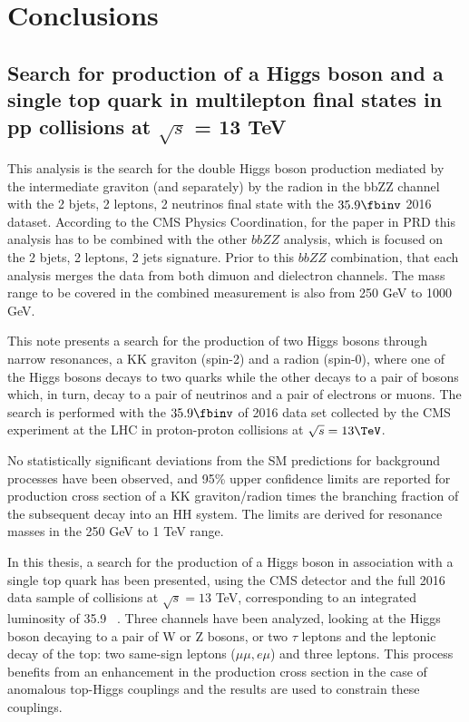 \chapter{Conclusions}
\label{ch:Conclusions}


\section[Search for production of a Higgs boson and a single top quark]{Search for production of a Higgs boson and a single top quark in multilepton final states in pp collisions at $\sqrt{s}$ = 13 TeV}



This analysis is the search for the double Higgs boson production mediated by the intermediate graviton (and separately) by the radion in the bbZZ channel with the 2 bjets, 2 leptons, 2 neutrinos final state with the $35.9\fbinv$ 2016 dataset. According to the CMS Physics Coordination, for the paper in PRD this analysis has to be combined with the other $bbZZ$ analysis, which is focused on the 2 bjets, 2 leptons, 2 jets signature. Prior to this $bbZZ$ combination, that each analysis merges the data from both dimuon and dielectron channels. The mass range to be covered in the combined measurement is also from 250 GeV to 1000 GeV.

This note presents a search for the production of two Higgs bosons
through narrow resonances, a KK graviton (spin-2) and a radion (spin-0), where one of the Higgs bosons decays to
two \Pqb quarks while the other decays to a pair of \PZ bosons which, in
turn, decay to a pair of neutrinos and a pair of electrons or muons.
The search is performed with the $35.9\fbinv$ of 2016 data set
collected by the CMS experiment at the LHC in proton-proton collisions at
$\sqrt{s} = 13 \TeV$.

No statistically significant deviations from the SM predictions for
background processes have been observed, and 95\% upper confidence limits are reported for production cross section
of a KK graviton/radion times the branching fraction of the subsequent decay into an
HH system. The limits are derived for resonance masses in the 250 GeV to 1 TeV range.








In this thesis, a search for the production of a Higgs boson in association with a single top quark has been presented, using the CMS detector and the full 2016 data sample of \pp collisions at $\sqrt{s}=13$ TeV, corresponding to an integrated luminosity of 35.9 ~\fbinv. Three channels have been analyzed, looking at the Higgs boson decaying to a pair of W or Z bosons, or two $\tau$ leptons and the leptonic decay of the top: two same-sign leptons ($\mu\mu, e\mu$) and three leptons. This process benefits from an enhancement in the production cross section in the case of anomalous top-Higgs couplings and the results are used to constrain these couplings.

